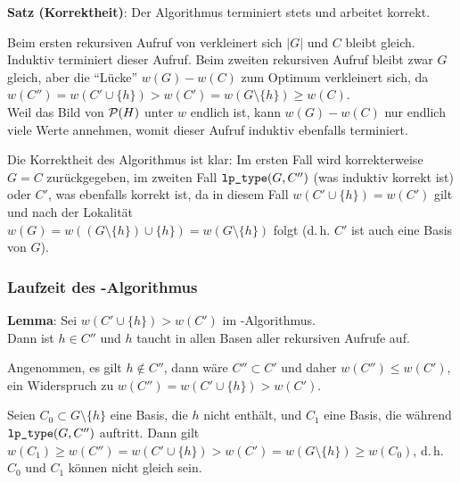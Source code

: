 \textbf{Satz (Korrektheit)}:
Der Algorithmus terminiert stets und arbeitet korrekt.

\begin{Beweis}
    Beim ersten rekursiven Aufruf von  verkleinert sich $|G|$ und $C$ bleibt gleich.
    Induktiv terminiert dieser Aufruf.
    Beim zweiten rekursiven Aufruf bleibt zwar $G$ gleich, aber die "`Lücke"' $w(G) - w(C)$
    zum Optimum verkleinert sich, da\\
    $w(C'') = w(C' \cup \{h\}) > w(C') = w(G \setminus \{h\}) \ge w(C)$.\\
    Weil das Bild von $\P(H)$ unter $w$ endlich ist, kann $w(G) - w(C)$ nur endlich viele Werte
    annehmen, womit dieser Aufruf induktiv ebenfalls terminiert.

    Die Korrektheit des Algorithmus ist klar:
    Im ersten Fall wird korrekterweise $G = C$ zurückgegeben,
    im zweiten Fall $\code{lp\_type}(G, C'')$ (was induktiv korrekt ist) oder
    $C'$, was ebenfalls korrekt ist, da in diesem Fall $w(C' \cup \{h\}) = w(C')$ gilt und nach
    der Lokalität\\
    $w(G) = w((G \setminus \{h\}) \cup \{h\}) = w(G \setminus \{h\})$ folgt
    (d.\,h. $C'$ ist auch eine Basis von $G$).
\end{Beweis}

\pagebreak

\subsubsection{%
    Laufzeit des -Algorithmus%
}

\textbf{Lemma}:
Sei $w(C' \cup \{h\}) > w(C')$ im -Algorithmus.\\
Dann ist $h \in C''$ und $h$ taucht in allen Basen aller rekursiven Aufrufe auf.

\begin{Beweis}
    Angenommen, es gilt $h \notin C''$,
    dann wäre $C'' \subset C'$ und daher $w(C'') \le w(C')$,
    ein Widerspruch zu $w(C'') = w(C' \cup \{h\}) > w(C')$.

    Seien $C_0 \subset G \setminus \{h\}$ eine Basis, die $h$ nicht enthält,
    und $C_1$ eine Basis, die während $\code{lp\_type}(G, C'')$ auftritt.
    Dann gilt $w(C_1) \ge w(C'') = w(C' \cup \{h\}) > w(C') = w(G \setminus \{h\}) \ge w(C_0)$,
    d.\,h. $C_0$ und $C_1$ können nicht gleich sein.
\end{Beweis}

\linie

